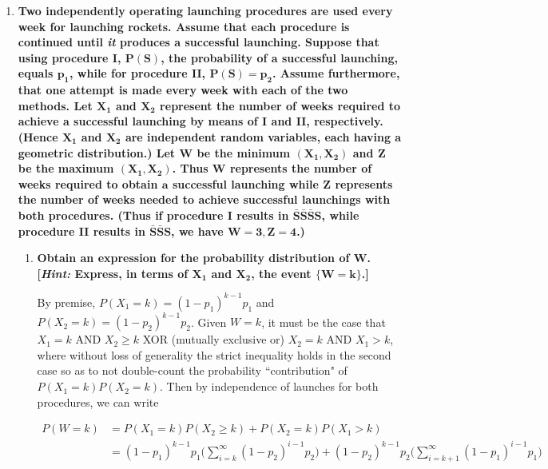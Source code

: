 \documentclass[10pt, oneside]{article}
\begin{document}
\begin{enumerate}[label=8.\arabic*]
\item  \begin{tcolorbox}[
  colback=Cerulean!5!white,
  colframe=Cerulean!75!black]
\textbf{Two independently operating launching procedures are used every week for launching rockets. Assume that each procedure is continued until \textit{it} produces a successful launching. Suppose that using procedure I, $\bm{P(S)}$, the probability of a successful launching, equals $\bm{p_1}$, while for procedure II, $\bm{P(S) = p_2}$. Assume furthermore, that one attempt is made every week with each of the two methods. Let $\bm{X_1}$ and $\bm{X_2}$ represent the number of weeks required to achieve a successful launching by means of I and II, respectively. (Hence $\bm{X_1}$ and $\bm{X_2}$ are independent random variables, each having a geometric distribution.) Let $\bm{W}$ be the minimum $\bm{(X_1, X_2)}$ and $\bm{Z}$ be the maximum $\bm{(X_1, X_2)}$. Thus $\bm{W}$ represents the number of weeks required to obtain $\bm{a}$ successful launching while $\bm{Z}$ represents the number of weeks needed to achieve successful launchings with both procedures. (Thus if procedure I results in $\bm{\bar{S} \bar{S} \bar{S} S}$, while procedure II results in $\bm{\bar{S} \bar{S} S}$, we have $\bm{W = 3, Z = 4}$.)}
\end{tcolorbox}

	\begin{enumerate}
	\item  \begin{tcolorbox}[
	  colback=Cerulean!5!white,
	  colframe=Cerulean!75!black]
	\textbf{Obtain an expression for the probability distribution of $\bm{W}$. [\textit{Hint:} Express, in terms of $\bm{X_1}$ and $\bm{X_2}$, the event $\bm{ \{ W = k \} }$.]}
	\end{tcolorbox}
	
	By premise, $P(X_1 = k) = (1 - p_1)^{k-1} p_1$ and $P(X_2 = k) = (1 - p_2)^{k-1} p_2$. Given $W = k$, it must be the case that $X_1 = k$ AND $X_2 \geq k$ XOR (mutually exclusive or) $X_2 = k$ AND $X_1 > k$, where without loss of generality the strict inequality holds in the second case so as to not double-count the probability ``contribution" of $P(X_1 = k) P(X_2 = k)$. Then by independence of launches for both procedures, we can write
	
	\begin{align*}
	P(W = k) &= P(X_1 = k) P(X_2 \geq k) + P(X_2 = k) P(X_1 > k) \\
	&= \boxed{ (1-p_1)^{k-1} p_1 \Bigg( \sum^{\infty}_{i=k} (1-p_2)^{i-1} p_2 \Bigg) + (1-p_2)^{k-1} p_2 \Bigg( \sum^{\infty}_{i = k+1} (1-p_1)^{i-1} p_1 \Bigg) }
	\end{align*}
	

\end{enumerate}
\end{enumerate}
\end{document}
